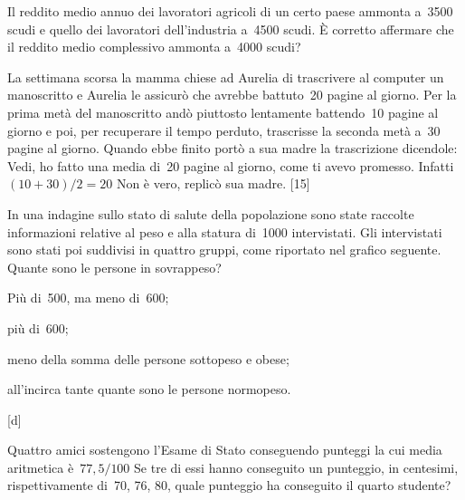 \begin{esercizio}
\label{ese:A.48}
Il reddito medio annuo dei lavoratori agricoli di un certo paese ammonta 
a~3500 scudi e quello dei lavoratori dell'industria
a~4500 scudi. È corretto affermare che il reddito medio complessivo ammonta 
a~4000 scudi?
\end{esercizio}

\begin{esercizio}
\label{ese:A.49}
La settimana scorsa la mamma chiese ad Aurelia di trascrivere al computer 
un manoscritto e Aurelia le assicurò che avrebbe
battuto~20 pagine al giorno. Per la prima metà del manoscritto andò 
piuttosto lentamente battendo~10 pagine al giorno e poi,
per recuperare il tempo perduto, trascrisse la seconda metà a~30 pagine al 
giorno.
Quando ebbe finito portò a sua madre la trascrizione dicendole: Vedi, ho 
fatto una media di~20 pagine al giorno,
come ti avevo promesso. Infatti~$(10+30)/2=20$ Non è vero, replicò sua 
madre.
\hfill [15]
\end{esercizio}

\begin{multicols}{2}
\begin{esercizio}
\label{ese:A.50}
In una indagine sullo stato di salute della popolazione sono state raccolte 
informazioni relative al peso e
alla statura di~1000 intervistati. Gli intervistati sono stati poi 
suddivisi in quattro gruppi,
come riportato nel grafico seguente. Quante sono le persone in sovrappeso?

\begin{enumeratea}
 \item Più di~500, ma meno di~600;
 \item più di~600;
 \item meno della somma delle persone sottopeso e obese;
 \item all'incirca tante quante sono le persone normopeso.
\end{enumeratea}
\begin{center}
 
\end{center}
\hfill [d]
\end{esercizio}
\end{multicols}

\begin{esercizio}
\label{ese:A.51}
Quattro amici sostengono l'Esame di Stato conseguendo punteggi la cui media 
aritmetica è~$77,5/100$
Se tre di essi hanno conseguito un punteggio, in centesimi, rispettivamente 
di~70, 76, 80, quale punteggio ha conseguito il quarto studente?
\end{esercizio}

